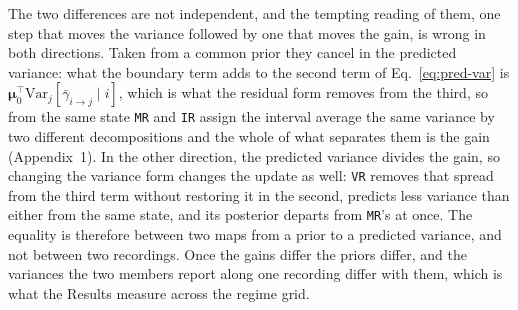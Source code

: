 The two differences are not independent, and the tempting reading of them, one step that
moves the variance followed by one that moves the gain, is wrong in both directions. Taken
from a common prior they cancel in the predicted variance: what the boundary term adds to
the second term of Eq.~\ref{eq:pred-var} is
$\bm{\mu}_0^\top\mathrm{Var}_{j}[\bar{\gamma}_{i\to j}\mid i]$, which is what
the residual form removes from the third, so from the same state \texttt{MR} and \texttt{IR}
assign the interval average the same variance by two different decompositions and the whole
of what separates them is the gain (Appendix~1). In the other direction, the predicted
variance divides the gain, so changing the variance form changes the update as well:
\texttt{VR} removes that spread from the third term without restoring it in the second,
predicts less variance than either from the same state, and its posterior departs from
\texttt{MR}'s at once. The equality is therefore between two maps from a prior to a
predicted variance, and not between two recordings. Once the gains differ the priors differ,
and the variances the two members report along one recording differ with them, which is what
the Results measure across the regime grid.

